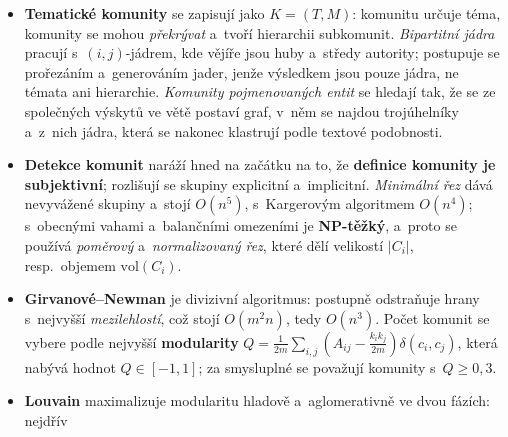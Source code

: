 \documentclass[11pt,a4paper]{article}
\theoremstyle{definition}
\begin{document}
\begin{itemize}
      $P(i)=\sum_{(j,i)\in E}P(j)/O_j$. Normalizaci \emph{nepotřebuje}, protože celkový
      PageRank zůstává konstantní, jako by šlo o~. Problém  řeší
      \emph{škálované} pravidlo s~tlumicím faktorem $d$, který se volí mezi 0,8--0,9 a~v~článku
      má hodnotu $0{,}85$; obrazně se tomu říká . Markovský řetězec potřebuje
      matici \emph{stochastickou, ireducibilní a~aperiodickou} a~webový graf nesplňuje ani jednu
      z~těchto podmínek: má visící stránky, není silně souvislý a~vykazuje periodicitu. Všechny
      tři nedostatky přitom napraví \emph{jediná} strategie, totiž odkaz z~každé stránky na
      každou s~malou pravděpodobností. Finální tvar je
      $P(i)=(1-d)+d\sum_{(j,i)\in E}P(j)/O_j$ a~řeší se mocninnou iterací. Výhodou je odolnost
      proti spamu, protože vstupní odkazy nelze snadno získat, a~globální offline míra;
      kritizuje se dotazová nezávislost.
\item \textbf{Tematické komunity} se zapisují jako $K=(T,M)$: komunitu určuje téma, komunity se
      mohou \emph{překrývat} a~tvoří hierarchii subkomunit. \emph{Bipartitní jádra} pracují
      s~$(i,j)$-jádrem, kde vějíře jsou huby a~středy autority; postupuje se prořezáním
      a~generováním jader, jenže výsledkem jsou pouze jádra, ne témata ani hierarchie.
      \emph{Komunity pojmenovaných entit} se hledají tak, že se ze společných výskytů ve větě
      postaví graf, v~něm se najdou trojúhelníky a~z~nich jádra, která se nakonec klastrují
      podle textové podobnosti.
\item \textbf{Detekce komunit} naráží hned na začátku na to, že \textbf{definice komunity je
      subjektivní}; rozlišují se skupiny explicitní a~implicitní. \emph{Minimální řez} dává
      nevyvážené skupiny a~stojí $O(n^5)$, s~Kargerovým algoritmem $O(n^4)$; s~obecnými vahami
      a~balančními omezeními je \textbf{NP-těžký}, a~proto se používá \emph{poměrový}
      a~\emph{normalizovaný řez}, které dělí velikostí $|C_i|$, resp.\ objemem
      $\mathrm{vol}(C_i)$.
\item \textbf{Girvanové--Newman} je divizivní algoritmus: postupně odstraňuje hrany s~nejvyšší
      \emph{mezilehlostí}, což stojí $O(m^2n)$, tedy $O(n^3)$. Počet komunit se vybere podle
      nejvyšší \textbf{modularity}
      $Q=\frac{1}{2m}\sum_{i,j}(A_{ij}-\frac{k_ik_j}{2m})\delta(c_i,c_j)$, která nabývá hodnot
      $Q\in[-1,1]$; za smysluplné se považují komunity s~$Q\ge 0{,}3$.
\item \textbf{Louvain} maximalizuje modularitu hladově a~aglomerativně ve dvou fázích: nejdřív

\end{itemize}
\end{document}
